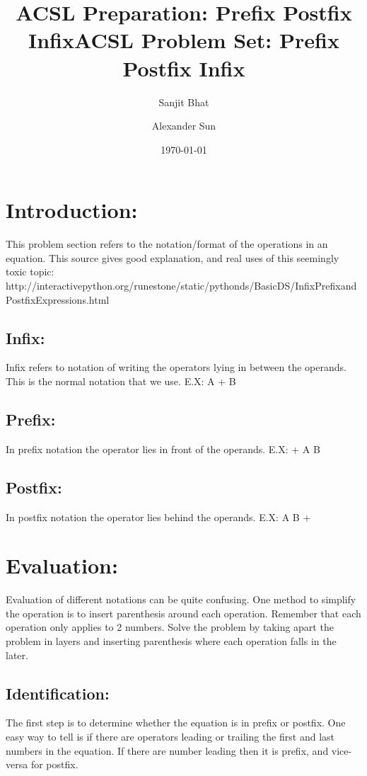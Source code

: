 \documentclass{article}
\title{ACSL Preparation: Prefix Postfix Infix}
\author{Sanjit Bhat \and Alexander Sun}
\date{\today}
\begin{document}
\maketitle

\newpage

\begin{center}
    \title{ACSL Problem Set: Prefix Postfix Infix}
\end{center}

\section{Introduction:}
This problem section refers to the notation/format of the operations in an equation. This source gives good explanation, and real uses of this seemingly toxic topic: http://interactivepython.org/runestone/static/pythonds/BasicDS/InfixPrefixandPostfixExpressions.html

\subsection{Infix:}
Infix refers to notation of writing the operators lying in between the operands. This is the normal notation that we use. E.X: A + B

\subsection{Prefix:}
In prefix notation the operator lies in front of the operands. E.X: + A B

\subsection{Postfix:}
In postfix notation the operator lies behind the operands. E.X: A B +

\section{Evaluation:}
Evaluation of different notations can be quite confusing. One method to simplify the operation is to insert parenthesis around each operation. Remember that each operation only applies to 2 numbers. Solve the problem by taking apart the problem in layers and inserting parenthesis where each operation falls in the later. 

\subsection{Identification:}
The first step is to determine whether the equation is in prefix or postfix. One easy way to tell is if there are operators leading or trailing the first and last numbers in the equation. If there are number leading then it is prefix, and vice-versa for postfix.
\end{document}

